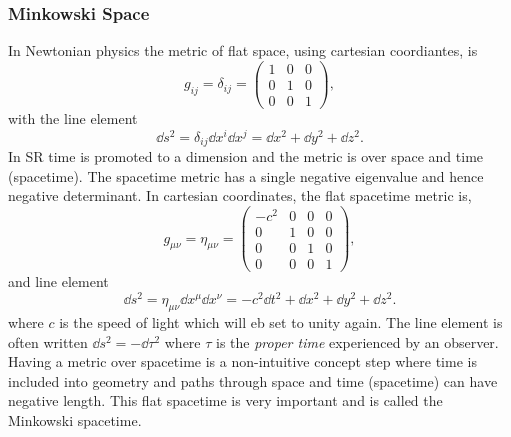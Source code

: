 \subsubsection{Minkowski Space}
In Newtonian physics the metric of flat space, using cartesian coordiantes, is 
\begin{equation}
g_{ij} = \delta_{ij} = \begin{pmatrix} 1 & 0 & 0 \\ 0 & 1 & 0 \\ 0 & 0 & 1 \end{pmatrix},
\end{equation}
with the line element
\begin{equation}
\dd s ^2 = \delta_{ij} \dd x^i \dd x^j = \dd x^2 + \dd y^2 + \dd z^2.
\end{equation}
In SR time is promoted to a dimension and the metric is over space and time (spacetime). The spacetime metric has a single negative eigenvalue and hence negative determinant. In cartesian coordinates, the flat spacetime metric is,
\begin{equation}
g_{\mu\nu} = \eta_{\mu\nu} = \begin{pmatrix} -c^2 &0 &0 &0\\ 0 & 1 & 0 & 0 \\ 0 & 0 & 1 & 0 \\ 0 & 0 & 0 & 1 \end{pmatrix},
\end{equation}
and line element
\begin{equation}
\dd s ^2 = \eta_{\mu\nu} \dd x^\mu \dd x^\nu = -c^2\dd t^2 + \dd x^2 + \dd y^2 + \dd z^2.
\end{equation}
where $c$ is the speed of light which will eb set to unity again. The line element is often written $\dd s^2 = -\dd \tau^2$ where $\tau$ is the {\it proper time} experienced by an observer. Having a metric over spacetime is a non-intuitive concept step where time is included into geometry and paths through space and time (spacetime) can have negative length. This flat spacetime is very important and is called the Minkowski spacetime. 

